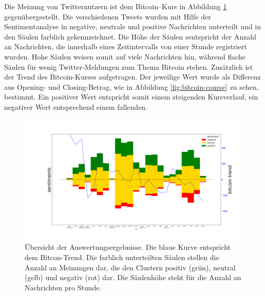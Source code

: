 Die Meinung von Twitternutzern ist dem Bitcoin--Kurs in Abbildung \ref{fig:result} gegen\"ubergestellt. Die verschiedenen Tweets wurden mit Hilfe der Sentimentanalyse in negative, neutrale und positive Nachrichten unterteilt und in den S\"aulen farblich gekennzeichnet. Die H\"ohe der S\"aulen sentspricht der Anzahl an Nachrichten, die innerhalb eines Zeitintervalls von einer Stunde registriert wurden. Hohe S\"aulen weisen somit auf viele Nachrichten hin, während flache S\"aulen f\"ur wenig Twitter-Meldungen zum Thema Bitcoin stehen. 
Zus\"atzlich ist der Trend des Bitcoin-Kurses aufgetragen. Der jeweilige Wert wurde als Differenz aus Opening- und Closing-Betrag, wie in Abbildung \ref{fig:bitcoin-course} zu sehen, bestimmt. Ein positiver Wert entspricht somit einem steigenden Kursverlauf, ein negativer Wert entsprechend einem fallenden.

\begin{figure}[htb]
	\includegraphics[width=\textwidth]{result}
	\caption{\"Ubersicht der Auswertungsergebnisse. Die blaue Kurve entspricht dem Bitcon-Trend. Die farblich unterteilten S\"aulen stellen die Anzahl an Meinungen dar, die den Clustern positiv (gr\"un), neutral (gelb) und negativ (rot) dar. Die S\"aulenh\"ohe steht f\"ur die Anzahl an Nachrichten pro Stunde.}
	\label{fig:result}
\end{figure}

